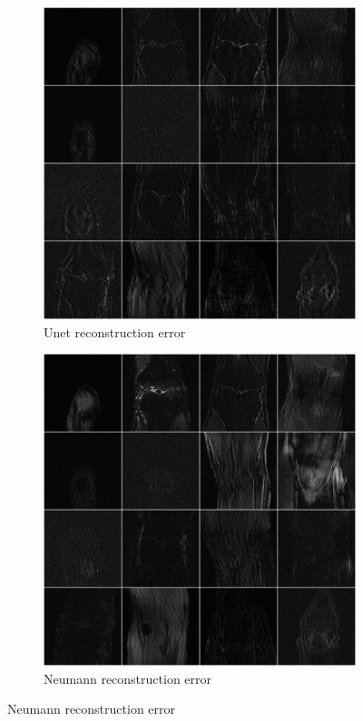 \documentclass{article}
\begin{document}
\newpage
\begin{figure}[H] 
\centering
   \begin{subfigure}[]{.5\textwidth}
   \centering
        \includegraphics[width=.95\linewidth]{Unet_error}
	\caption{Unet reconstruction error}
	\vspace*{2mm} 
    \end{subfigure}%
   \begin{subfigure}[]{.5\textwidth}
   \centering
        \includegraphics[width=.95\linewidth]{neumann_error}
	\caption{Neumann reconstruction error}
	\vspace*{2mm}
    \end{subfigure}%
\end{figure}


%
%
\end{document}
